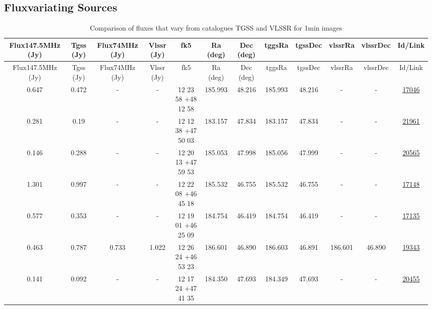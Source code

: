 \documentclass{article}
\begin{document}
\begin{landscape}

\section{Fluxvariating Sources}\label{varsection:KmeulenTrap4P23:1min}

\begin{longtable}{c|c|c|c|c|c|c|c|c|c|c|c} 
\toprule 
Flux147.5MHz (Jy) & Tgss (Jy) & Flux74MHz (Jy)& Vlssr (Jy) & fk5 & Ra (deg) & Dec (deg) &tggsRa&tgssDec&vlssrRa&vlssrDec& Id/Link \\\midrule 
\endfirsthead 
\toprule 
Flux147.5MHz (Jy) & Tgss (Jy) & Flux74MHz (Jy)& Vlssr (Jy)& fk5 & Ra (deg) & Dec (deg)  &tggsRa&tgssDec&vlssrRa&vlssrDec& Id/Link \\\midrule 
\endhead 
\bottomrule 
\endfoot 
\bottomrule
\caption{ Comparison of fluxes that vary from catalogues TGSS and VLSSR for 1min images} 
\endlastfoot
\label{KmeulenTrap4P23:1min:tablevar}
0.647 & 0.472 & - & - & 12 23 58 +48 12 58 &  185.993 & 48.216 &  185.993 & 48.216 & - & - & \href{http://banana.transientskp.org/r4/vlo_KmeulenTrap4P23/runningcatalog/17046}{17046}  \\
0.281 & 0.19 & - & - & 12 12 38 +47 50 03 &  183.157 & 47.834 &  183.157 & 47.834 & - & - & \href{http://banana.transientskp.org/r4/vlo_KmeulenTrap4P23/runningcatalog/21961}{21961}  \\
0.146 & 0.288 & - & - & 12 20 13 +47 59 53 &  185.053 & 47.998 &  185.056 & 47.999 & - & - & \href{http://banana.transientskp.org/r4/vlo_KmeulenTrap4P23/runningcatalog/20565}{20565}  \\
1.301 & 0.997 & - & - & 12 22 08 +46 45 18 &  185.532 & 46.755 &  185.532 & 46.755 & - & - & \href{http://banana.transientskp.org/r4/vlo_KmeulenTrap4P23/runningcatalog/17148}{17148}  \\
0.577 & 0.353 & - & - & 12 19 01 +46 25 09 &  184.754 & 46.419 &  184.754 & 46.419 & - & - & \href{http://banana.transientskp.org/r4/vlo_KmeulenTrap4P23/runningcatalog/17135}{17135}  \\
0.463 & 0.787 & 0.733 & 1.022 & 12 26 24 +46 53 23 &  186.601 & 46.890 &  186.603 & 46.891 & 186.601 & 46.890 & \href{http://banana.transientskp.org/r4/vlo_KmeulenTrap4P23/runningcatalog/19343}{19343}  \\
0.141 & 0.092 & - & - & 12 17 24 +47 41 35 &  184.350 & 47.693 &  184.349 & 47.693 & - & - & \href{http://banana.transientskp.org/r4/vlo_KmeulenTrap4P23/runningcatalog/20455}{20455}  \\

\end{longtable}
\end{landscape}
\end{document}

